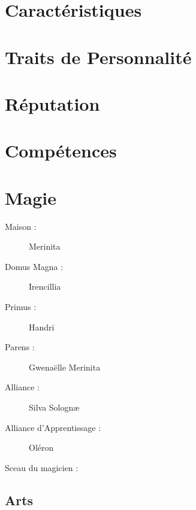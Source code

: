 \section*{Caractéristiques}


\caractableMP

\begin{multicols*}{2}


\longVFQs

\section*{Traits de Personnalité}

\traitslong

\section*{Réputation}

\reputationslong

\section*{Compétences}

\abilitieslong

\end{multicols*}
\pagebreak

\section*{Magie}
\begin{multicols}{2}
\begin{description}
\item[Maison :] Merinita
\item[Domus Magna :] Irencillia
\item[Primus :] Handri
\item[Parens :] Gwenaëlle Merinita
\item[Alliance :] Silva Solognæ
\item[Alliance d'Apprentissage :] Oléron
\item[Sceau du magicien :] \magussigil
\end{description}
\end{multicols}
\subsection*{Arts}

